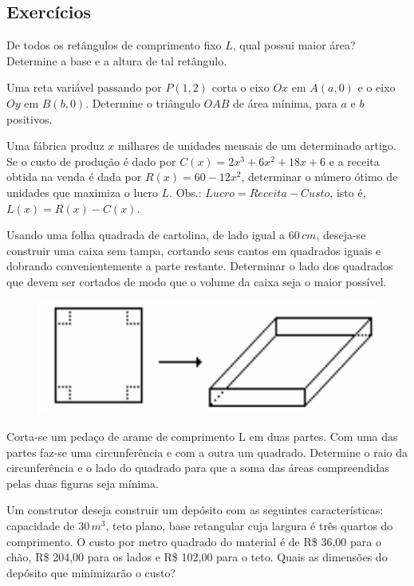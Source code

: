\cleardoublepage\documentclass[../main.tex]{subfiles}
\begin{document}
\subsection{Exercícios}
\begin{exer}
 De todos os retângulos de comprimento fixo $L$, qual possui maior área? Determine a base e a 
altura de tal retângulo.
\end{exer}
\begin{exer}
 Uma reta variável passando por $P (1, 2)$ corta o eixo $Ox$ em $A(a,0)$ e o eixo $Oy$ em $B(b,0)$. Determine o triângulo $OAB$ de área mínima, para $a$ e $b$ positivos. 
 \end{exer}
 \begin{exer}
 Uma fábrica produz $x$ milhares de unidades mensais de um determinado artigo. Se o custo de produção é dado por $C(x)=2x^3+6x^2+18x+6$ e a receita obtida na venda é dada por $R(x)=60-12x^2$, determinar o número ótimo de unidades que maximiza o lucro $L$. Obs.: $Lucro = Receita - Custo$, isto é, $L(x)=R(x)-C(x)$.
 \end{exer}
  \begin{exer}
Usando uma folha quadrada de cartolina, de lado igual a $60\, cm$, deseja-se construir uma caixa  sem tampa, cortando seus cantos em quadrados iguais e dobrando convenientemente a parte restante. Determinar o lado dos quadrados que devem ser cortados de modo que o volume da caixa seja o maior possível.
\begin{figure}[H]
    \centering
    \includegraphics{fig_apl_deriv/Otmiz-PlanifCaixa.png}
\end{figure}
\end{exer}
\begin{exer}
 Corta-se um pedaço de arame de comprimento L em duas partes. Com uma das partes faz-se uma circunferência e com a outra um quadrado. Determine o raio da circunferência e o lado do quadrado para que a soma das áreas compreendidas pelas duas figuras seja mínima. 
 \end{exer}
\begin{exer}
Um construtor deseja construir um depósito com as seguintes características: capacidade de $30 \, m^3$, teto plano, base retangular cuja largura é três quartos do comprimento. O custo por metro quadrado do material é de R\$ 36,00 para o chão, R\$ 204,00 para os lados e R\$ 102,00 para o teto. Quais as dimensões do depósito que minimizarão o custo? 
\end{exer}
\end{document}
